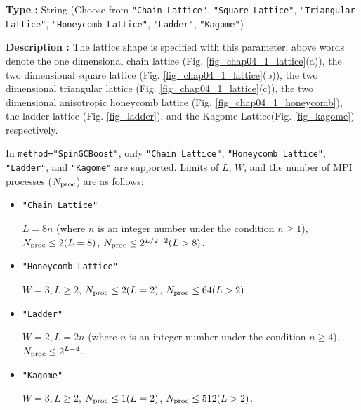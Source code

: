 \begin{itemize}
{\bf Type :} String (Choose from \verb|"Chain Lattice"|, \verb|"Square Lattice"|, 
\verb|"Triangular Lattice"|, \verb|"Honeycomb Lattice"|, \verb|"Ladder"|, \verb|"Kagome"|)

{\bf Description :} The lattice shape is specified with this parameter;
above words denote
the one dimensional chain lattice (Fig. \ref{fig_chap04_1_lattice}(a)), 
the two dimensional square lattice (Fig. \ref{fig_chap04_1_lattice}(b)),
the two dimensional triangular lattice (Fig. \ref{fig_chap04_1_lattice}(c)),
the two dimensional anisotropic honeycomb lattice (Fig. \ref{fig_chap04_1_honeycomb}),
the ladder lattice (Fig. \ref{fig_ladder}),
and
the Kagome Lattice(Fig. \ref{fig_kagome})
respectively.

In \verb|method="SpinGCBoost"|,
only \verb|"Chain Lattice"|, \verb|"Honeycomb Lattice"|, 
\verb|"Ladder"|, and \verb|"Kagome"| are supported.
Limits of $L$, $W$, and the number of MPI processes ($N_{\rm proc}$) are as follows:

\begin{itemize}

  \item \verb|"Chain Lattice"|

    $L = 8n$ (where $n$ is an integer number under the condition  $n\geq1$),
    $N_{\rm proc} \leq 2(L=8)$, $N_{\rm proc} \leq 2^{L/2-2}(L>8)$.
    
  \item \verb|"Honeycomb Lattice"|

    $W=3, L \geq 2$, $N_{\rm proc} \leq 2(L=2)$, $N_{\rm proc} \leq 64(L>2)$.

  \item \verb|"Ladder"|

    $W=2, L = 2n$ (where $n$ is an integer number under the condition  $n\geq4$),
    $N_{\rm proc} \leq 2^{L-4}$.

  \item \verb|"Kagome"|

    $W=3, L \geq 2$, $N_{\rm proc} \leq 1(L=2)$, $N_{\rm proc} \leq 512(L>2)$.

\end{itemize}


\end{itemize}
